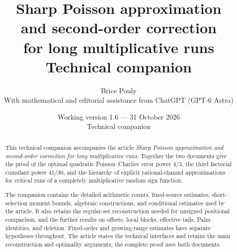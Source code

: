 \documentclass[11pt,a4paper]{article}
\title{\bfseries Sharp Poisson approximation\\and second-order correction\\for long multiplicative runs\\[9pt]\large Technical companion}
\author{Brice Pouly\\[5pt]
 \small With mathematical and editorial assistance from ChatGPT (GPT-6 Astra)}
\date{\small Working version 1.6 --- 31 October 2026\\[3pt]Technical companion}
\begin{document}
\maketitle
\thispagestyle{plain}
\begin{abstract}
This technical companion accompanies the article \emph{Sharp Poisson
approximation and second-order correction for long multiplicative runs}.
Together the two documents give the proof of the optimal quadratic
Poisson--Charlier error power \(4/3\), the third factorial cumulant
power \(41/30\), and the hierarchy of explicit rational-channel
approximations for critical runs of a completely multiplicative
random sign function.

The companion contains the detailed arithmetic counts, fixed-source
estimates, short-selection moment bounds, algebraic constructions,
and conditional estimates used by the article. It also retains the
regular-set reconstruction needed for unsigned positional comparison,
and the further results on offsets, local blocks, effective tails,
Palm identities, and deletion. Fixed-order and growing-range
estimates have separate hypotheses throughout. The article states
the technical interfaces and retains the main reconstruction and
optimality arguments; the complete proof uses both documents.
\end{abstract}
\clearpage
\begingroup
\small
\setlength{\parskip}{0pt}
\tableofcontents
\endgroup
\clearpage






















\clearpage

\end{document}
